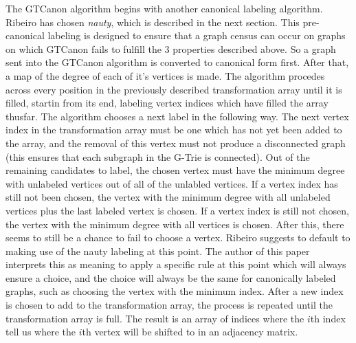 The GTCanon algorithm begins with another canonical labeling algorithm. Ribeiro has chosen \emph{nauty}, which is described in the next section. This pre-canonical labeling is designed to ensure that a graph census can occur on graphs on which GTCanon fails to fulfill the 3 properties described above. So a graph sent into the GTCanon algorithm is converted to canonical form first. After that, a map of the degree of each of it's vertices is made. The algorithm procedes across every position in the previously described transformation array until it is filled, startin from its end, labeling vertex indices which have filled the array thusfar. The algorithm chooses a next label in the following way. The next vertex index in the transformation array must be one which has not yet been added to the array, and the removal of this vertex must not produce a disconnected graph (this ensures that each subgraph in the G-Trie is connected). Out of the remaining candidates to label, the chosen vertex must have the minimum degree with unlabeled vertices out of all of the unlabled vertices. If a vertex index has still not been chosen, the vertex with the minimum degree with all unlabeled vertices plus the last labeled vertex is chosen. If a vertex index is still not chosen, the vertex with the minimum degree with all vertices is chosen. After this, there seems to still be a chance to fail to choose a vertex. Ribeiro suggests to default to making use of the nauty labeling at this point. The author of this paper interprets this as meaning to apply a specific rule at this point which will always ensure a choice, and the choice will always be the same for canonically labeled graphs, such as choosing the vertex with the minimum index. After a new index is chosen to add to the transformation array, the process is repeated until the transformation array is full. The result is an array of indices where the $i$th index tell us where the $i$th vertex will be shifted to in an adjacency matrix.\\
